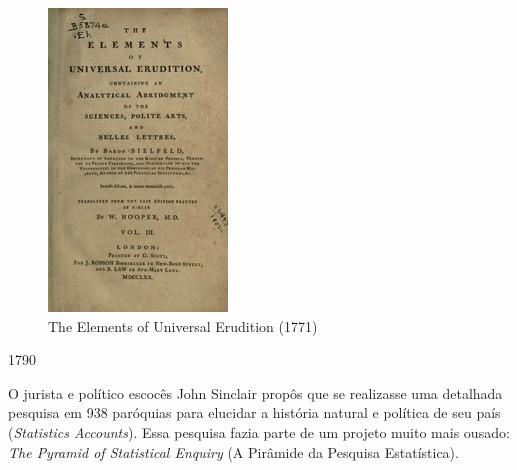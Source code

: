 \documentclass[
]{book}
\begin{document}
\hfill\break

\begin{figure}

{\centering \includegraphics[width=0.75\linewidth]{images1/hooper} 

}

\caption{The Elements of Universal Erudition  (1771)}\label{fig:unnamed-chunk-8}
\end{figure}

\hfill\break

1790

\hfill\break

O jurista e político escocês John Sinclair propôs que se realizasse uma detalhada pesquisa em 938 paróquias para elucidar a história natural e política de seu país (\emph{Statistics Accounts}). Essa pesquisa fazia parte de um projeto muito mais ousado: \emph{The Pyramid of Statistical Enquiry} (A Pirâmide da Pesquisa Estatística).

\hfill\break
\end{document}
